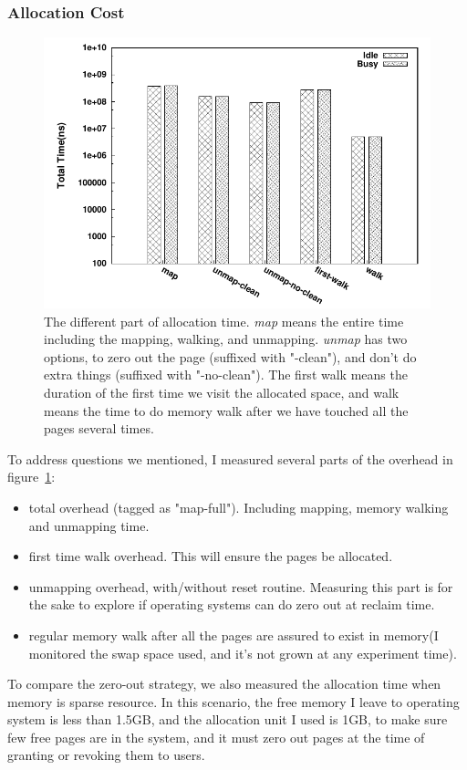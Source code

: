 \subsubsection{Allocation Cost}
\begin{figure}[htpb]
\centering
\includegraphics[width=0.9\linewidth]{../figures/alloc}
\caption{The different part of allocation time. \emph{map} means the entire time
including the mapping, walking, and unmapping. \emph{unmap} has two options, to
zero out the page (suffixed with "-clean"), and don't do extra things (suffixed
with "-no-clean"). The first walk means the duration of the first time we visit
the allocated space, and walk means the time to do memory walk after we have
touched all the pages several times.}
\label{fig:alloc}
\end{figure}
To address questions we mentioned, I measured several parts of the overhead in 
figure~\ref{fig:alloc}:
\begin{itemize}
\item total overhead (tagged as "map-full"). Including mapping, memory walking
and unmapping time.
\item first time walk overhead. This will ensure the pages be allocated.
\item unmapping overhead, with/without reset routine. Measuring this part is
for the sake to explore if operating systems can do zero out at reclaim time.
\item regular memory walk after all the pages are assured to exist in memory(I
monitored the swap space used, and it's not grown at any experiment time).
\end{itemize}
To compare the zero-out strategy, we also measured the allocation time when
memory is sparse  resource. In this scenario, the free memory I leave to
operating system is less than 1.5GB, and the allocation unit I used is 1GB, to
make sure few free pages are in the system, and it must zero out pages at the
time of granting or revoking them to users.

